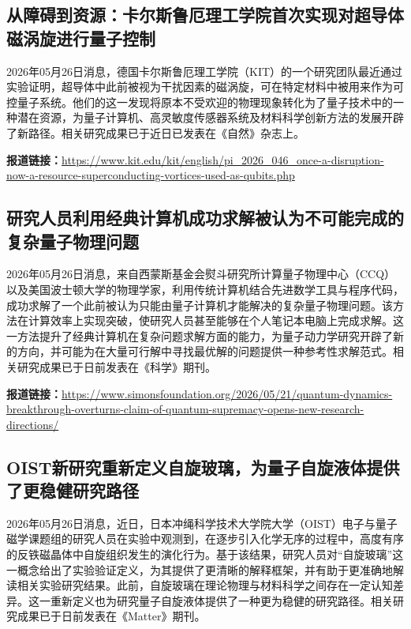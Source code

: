 \documentclass[12pt,a4paper]{ctexart}
\begin{document}
\subsection{ 从障碍到资源：卡尔斯鲁厄理工学院首次实现对超导体磁涡旋进行量子控制 }

2026年05月26日消息，德国卡尔斯鲁厄理工学院（KIT）的一个研究团队最近通过实验证明，超导体中此前被视为干扰因素的磁涡旋，可在特定材料中被用来作为可控量子系统。他们的这一发现将原本不受欢迎的物理现象转化为了量子技术中的一种潜在资源，为量子计算机、高灵敏度传感器系统及材料科学创新方法的发展开辟了新路径。相关研究成果已于近日已发表在《自然》杂志上。

\noindent\textbf{报道链接：}\url{https://www.kit.edu/kit/english/pi\_2026\_046\_once-a-disruption-now-a-resource-superconducting-vortices-used-as-qubits.php}

\subsection{ 研究人员利用经典计算机成功求解被认为不可能完成的复杂量子物理问题 }

2026年05月26日消息，来自西蒙斯基金会熨斗研究所计算量子物理中心（CCQ）以及美国波士顿大学的物理学家，利用传统计算机结合先进数学工具与程序代码，成功求解了一个此前被认为只能由量子计算机才能解决的复杂量子物理问题。该方法在计算效率上实现突破，使研究人员甚至能够在个人笔记本电脑上完成求解。这一方法提升了经典计算机在复杂问题求解方面的能力，为量子动力学研究开辟了新的方向，并可能为在大量可行解中寻找最优解的问题提供一种参考性求解范式。相关研究成果已于日前发表在《科学》期刊。

\noindent\textbf{报道链接：}\url{https://www.simonsfoundation.org/2026/05/21/quantum-dynamics-breakthrough-overturns-claim-of-quantum-supremacy-opens-new-research-directions/}

\subsection{ OIST新研究重新定义自旋玻璃，为量子自旋液体提供了更稳健研究路径 }

2026年05月26日消息，近日，日本冲绳科学技术大学院大学（OIST）电子与量子磁学课题组的研究人员在实验中观测到，在逐步引入化学无序的过程中，高度有序的反铁磁晶体中自旋组织发生的演化行为。基于该结果，研究人员对“自旋玻璃”这一概念给出了实验验证定义，为其提供了更清晰的解释框架，并有助于更准确地解读相关实验研究结果。此前，自旋玻璃在理论物理与材料科学之间存在一定认知差异。这一重新定义也为研究量子自旋液体提供了一种更为稳健的研究路径。相关研究成果已于日前发表在《Matter》期刊。
\end{document}
